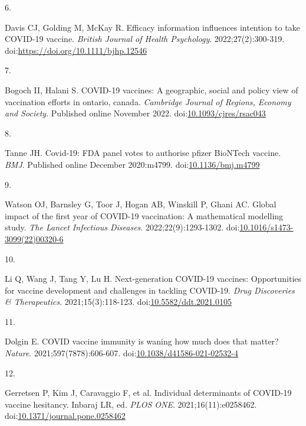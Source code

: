 \documentclass[
]{article}
\newlength{\cslhangindent}
\newlength{\csllabelwidth}
\newlength{\cslentryspacingunit} %
\newenvironment{CSLReferences}[2] %
 {%
  \setlength{\parindent}{0pt}
  \ifodd #1
  \let\oldpar\par
  \def\par{\hangindent=\cslhangindent\oldpar}
  \fi
  \setlength{\parskip}{#2\cslentryspacingunit}
 }%
 {}
\newcommand{\CSLLeftMargin}[1]{\parbox[t]{\csllabelwidth}{#1}}
\newcommand{\CSLRightInline}[1]{\parbox[t]{\linewidth - \csllabelwidth}{#1}\break}
\begin{document}
\begin{CSLReferences}{0}{0}
\leavevmode{}%
\CSLLeftMargin{6. }%
\CSLRightInline{Davis CJ, Golding M, McKay R. Efficacy information
influences intention to take COVID-19 vaccine. \emph{British Journal of
Health Psychology}. 2022;27(2):300-319.
doi:\url{https://doi.org/10.1111/bjhp.12546}}

\leavevmode{}%
\CSLLeftMargin{7. }%
\CSLRightInline{Bogoch II, Halani S. {COVID}-19 vaccines: A geographic,
social and policy view of vaccination efforts in ontario, canada.
\emph{Cambridge Journal of Regions, Economy and Society}. Published
online November 2022.
doi:\href{https://doi.org/10.1093/cjres/rsac043}{10.1093/cjres/rsac043}}

\leavevmode{}%
\CSLLeftMargin{8. }%
\CSLRightInline{Tanne JH. Covid-19: {FDA} panel votes to authorise
pfizer {BioNTech} vaccine. \emph{{BMJ}}. Published online December
2020:m4799.
doi:\href{https://doi.org/10.1136/bmj.m4799}{10.1136/bmj.m4799}}

\leavevmode{}%
\CSLLeftMargin{9. }%
\CSLRightInline{Watson OJ, Barnsley G, Toor J, Hogan AB, Winskill P,
Ghani AC. Global impact of the first year of {COVID}-19 vaccination: A
mathematical modelling study. \emph{The Lancet Infectious Diseases}.
2022;22(9):1293-1302.
doi:\href{https://doi.org/10.1016/s1473-3099(22)00320-6}{10.1016/s1473-3099(22)00320-6}}

\leavevmode{}%
\CSLLeftMargin{10. }%
\CSLRightInline{Li Q, Wang J, Tang Y, Lu H. Next-generation COVID-19
vaccines: Opportunities for vaccine development and challenges in
tackling COVID-19. \emph{Drug Discoveries \& Therapeutics}.
2021;15(3):118-123.
doi:\href{https://doi.org/10.5582/ddt.2021.0105}{10.5582/ddt.2021.0105}}

\leavevmode{}%
\CSLLeftMargin{11. }%
\CSLRightInline{Dolgin E. {COVID} vaccine immunity is waning
{\textemdash} how much does that matter? \emph{Nature}.
2021;597(7878):606-607.
doi:\href{https://doi.org/10.1038/d41586-021-02532-4}{10.1038/d41586-021-02532-4}}

\leavevmode{}%
\CSLLeftMargin{12. }%
\CSLRightInline{Gerretsen P, Kim J, Caravaggio F, et al. Individual
determinants of {COVID}-19 vaccine hesitancy. Inbaraj LR, ed.
\emph{{PLOS} {ONE}}. 2021;16(11):e0258462.
doi:\href{https://doi.org/10.1371/journal.pone.0258462}{10.1371/journal.pone.0258462}}


\end{CSLReferences}
\end{document}
